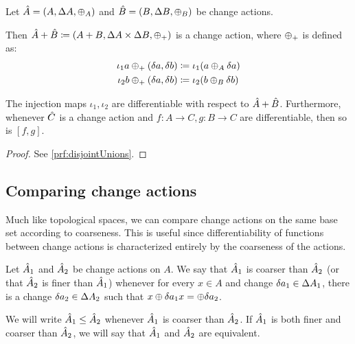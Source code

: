 \begin{prop}[name=Disjoint unions, restate=disjointUnions]
  \label{prop:disjointUnions}
  Let $\hat{A} = (A,\Delta A,\oplus_A)$ and $\hat{B} =
  (B,\Delta B,\oplus_B)$ be change actions.

  Then $\hat{A} + \hat{B} \coloneqq (A + B,\Delta A \times
  \Delta B,\oplus_{+})$ is a change action, where $\oplus_{+}$ is defined as:
  \begin{align*}
    \iota_1 a \oplus_{+} (\delta a, \delta b) &\coloneqq \iota_1 (a \oplus_A \delta a)\\
    \iota_2 b \oplus_{+} (\delta a, \delta b) &\coloneqq \iota_2 (b \oplus_B \delta b)
  \end{align*}
  
  The injection maps $\iota_1, \iota_2$ are differentiable with respect to $\hat{A} + \hat{B}$. Furthermore,
  whenever $\hat{C}$ is a change action and $f : A \rightarrow C, g: B \rightarrow C$ are differentiable,
  then so is $\left[ f, g \right]$.
\end{prop}
\ifproofs
\begin{proof}
  See \cref{prf:disjointUnions}.
\end{proof}
\fi

\subsection{Comparing change actions}

Much like topological spaces, we can compare change actions on the same
base set according to coarseness. This 
is useful since differentiability of functions between change actions is characterized
entirely by the coarseness of the actions.

\begin{defn}
  Let $\hat{A}_1$ and $ \hat{A}_2$ be 
  change actions on $A$. We say that $\hat{A}_1$ is coarser than $\hat{A}_2$ (or that $\hat{A}_2$ is finer
  than $\hat{A}_1$) whenever for every $x \in A$ and change $\delta a_1 \in
  \Delta A_1$, there is a change $\delta a_2 \in
  \Delta A_2$ such that $x \oplus \delta a_1 x = \oplus \delta a_2$.
  
  We will write $\hat{A}_1 \leq \hat{A}_2$ whenever $\hat{A}_1$ is coarser than $\hat{A}_2$.
  If $\hat{A}_1$ is both finer and coarser than $\hat{A}_2$, we will say that $\hat{A}_1$
  and $\hat{A}_2$ are equivalent.
\end{defn}

